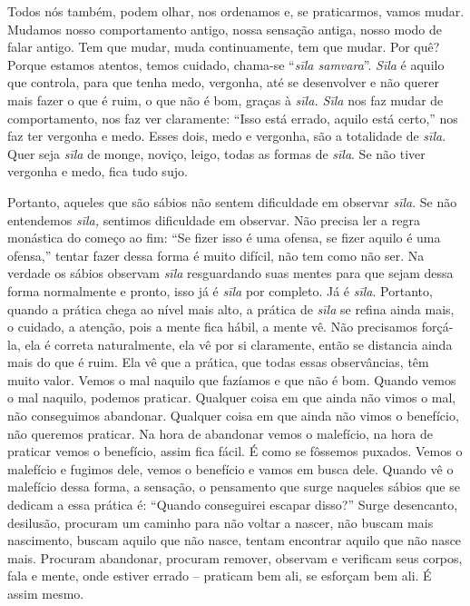 Todos nós também, podem olhar, nos ordenamos e, se praticarmos,
vamos mudar. Mudamos nosso comportamento antigo, nossa sensação antiga,
nosso modo de falar antigo. Tem que mudar, muda continuamente, tem que
mudar. Por quê? Porque estamos atentos, temos cuidado, chama-se
“\textit{sīla samvara}”. \textit{Sīla} é aquilo que controla,
para que tenha medo, vergonha, até se desenvolver e não querer mais
fazer o que é ruim, o que não é bom, graças à \textit{sīla. Sīla}
nos faz mudar de comportamento, nos faz ver claramente: “Isso está
errado, aquilo está certo,” nos faz ter vergonha e medo. Esses dois,
medo e vergonha, são a totalidade de \textit{sīla}. Quer seja
\textit{sīla} de monge, noviço, leigo, todas as formas de
\textit{sīla}. Se não tiver vergonha e medo, fica tudo sujo. 

Portanto, aqueles que são sábios não sentem dificuldade em observar
\textit{sīla}. Se não entendemos \textit{sīla,} sentimos
dificuldade em observar. Não precisa ler a regra monástica do começo ao
fim: “Se fizer isso é uma ofensa, se fizer aquilo é uma ofensa,” tentar
fazer dessa forma é muito difícil, não tem como não ser. Na verdade os
sábios observam \textit{sīla} resguardando suas mentes para que
sejam dessa forma normalmente e pronto, isso já é \textit{sīla} por
completo. Já é \textit{sīla}. Portanto, quando a prática chega ao
nível mais alto, a prática de \textit{sīla} se refina ainda mais, o
cuidado, a atenção, pois a mente fica hábil, a mente vê. Não precisamos
forçá-la, ela é correta naturalmente, ela vê por si claramente, então
se distancia ainda mais do que é ruim. Ela vê que a prática, que todas
essas observâncias, têm muito valor. Vemos o mal naquilo que fazíamos e
que não é bom. Quando vemos o mal naquilo, podemos praticar. Qualquer
coisa em que ainda não vimos o mal, não conseguimos abandonar. Qualquer
coisa em que ainda não vimos o benefício, não queremos praticar. Na
hora de abandonar vemos o malefício, na hora de praticar vemos o
benefício, assim fica fácil. É como se fôssemos puxados. Vemos o
malefício e fugimos dele, vemos o benefício e vamos em busca dele.
Quando vê o malefício dessa forma, a sensação, o pensamento que surge
naqueles sábios que se dedicam a essa prática é: “Quando conseguirei
escapar disso?” Surge desencanto, desilusão, procuram um caminho para
não voltar a nascer, não buscam mais nascimento, buscam aquilo que não
nasce, tentam encontrar aquilo que não nasce mais. Procuram abandonar,
procuram remover, observam e verificam seus corpos, fala e mente, onde
estiver errado – praticam bem ali, se esforçam bem ali. É assim mesmo. 

